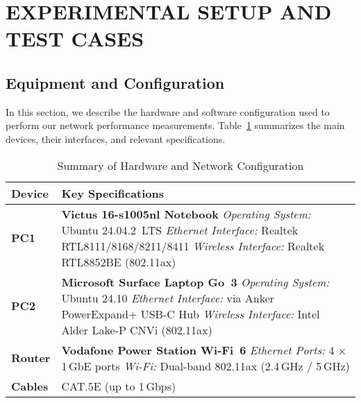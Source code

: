 
\section{EXPERIMENTAL SETUP AND TEST CASES} \label{sec:experimental-setup-and-test-cases}


    \subsection{Equipment and Configuration} \label{subsec:equipment-and-configuration}

        In this section, we describe the hardware and software configuration used to perform our network performance measurements. 
        Table~\ref{tab:equipment-summary} summarizes the main devices, their interfaces, and relevant specifications. 

        \begin{table}[ht]
            \small
            \centering
            \begin{tabular}{@{}l p{}@{}}
            \toprule
            \textbf{Device} & \textbf{Key Specifications} \\
            \midrule
            \textbf{PC1} 
                & \textbf{Victus 16-s1005nl Notebook} \newline
                \textit{Operating System:} Ubuntu 24.04.2~LTS \newline
                \textit{Ethernet Interface:} Realtek RTL8111/8168/8211/8411 \newline
                \textit{Wireless Interface:} Realtek RTL8852BE (802.11ax) \\
            \midrule
            \textbf{PC2} 
                & \textbf{Microsoft Surface Laptop Go~3} \newline
                \textit{Operating System:} Ubuntu 24.10 \newline
                \textit{Ethernet Interface:} via Anker PowerExpand+ USB-C Hub \newline
                \textit{Wireless Interface:} Intel Alder Lake-P CNVi (802.11ax) \\
            \midrule
            \textbf{Router} 
                & \textbf{Vodafone Power Station Wi-Fi~6} \newline
                \textit{Ethernet Ports:} 4 $\times$ 1\,GbE ports \newline
                \textit{Wi-Fi:} Dual-band 802.11ax (2.4\,GHz / 5\,GHz) \\
            \midrule
            \textbf{Cables} 
                & CAT.5E (up to 1\,Gbps) \\
            \bottomrule
            \end{tabular}
            \vspace{0.5cm}
            \caption{Summary of Hardware and Network Configuration}
            \label{tab:equipment-summary}
        \end{table}

